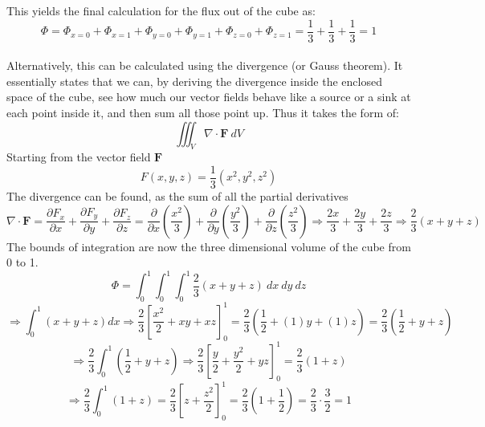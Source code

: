 This yields the final calculation for the flux out of the cube as:
\[\Phi =\Phi_{x=0} + \Phi_{x=1} + \Phi_{y=0} + \Phi_{y=1} + \Phi_{z=0} + \Phi_{z=1} = \frac{1}{3} + \frac{1}{3} + \frac{1}{3} = 1 \]
\\
Alternatively, this can be calculated using the divergence (or Gauss theorem). It essentially states that we can, by deriving the divergence
inside the enclosed space of the cube, see how much our vector fields behave like a source or a sink at each point inside it, and then sum all those 
point up. Thus it takes the form of: \[\iiint_V \nabla \cdot \mathbf{F} \ dV\]
Starting from the vector field $\mathbf{F}$
\[F(x,y,z) = \frac{1}{3}(x^2,y^2,z^2)\]
The divergence can be found, as the sum of all the partial derivatives
\[\nabla \cdot \mathbf{F} = 
\frac{\partial F_x}{\partial x} +
\frac{\partial F_y}{\partial y} +
\frac{\partial F_z}{\partial z} = 
\frac{\partial}{\partial x}\left(\frac{x^2}{3}\right) + 
\frac{\partial}{\partial y}\left(\frac{y^2}{3}\right) + 
\frac{\partial}{\partial z}\left(\frac{z^2}{3}\right)  
\Rightarrow
\frac{2x}{3} + \frac{2y}{3} + \frac{2z}{3} 
\Rightarrow
\frac{2}{3}(x+y+z)
\]
The bounds of integration are now the three dimensional volume of the cube from 0 to 1.
\[\Phi = \int_{0}^{1}\int_{0}^{1}\int_{0}^{1} \frac{2}{3}(x+y+z) \ dx \ dy \ dz \]
\[\Rightarrow \int_{0}^{1} (x+y+z) dx \Rightarrow \frac{2}{3}\left[\frac{x^2}{2} + xy + xz\right]_0^1 =\frac{2}{3}\left(\frac{1}{2}  + (1)y + (1)z\right) =\frac{2}{3}\left(\frac{1}{2} + y + z\right)\]
\[\Rightarrow \frac{2}{3}\int_{0}^{1} \left(\frac{1}{2} + y + z\right) \Rightarrow \frac{2}{3}\left[\frac{y}{2} + \frac{y^2}{2} + yz\right]_0^1 =\frac{2}{3}\left(1+z\right) \]
\[\Rightarrow \frac{2}{3}\int_{0}^{1} \left(1+z\right) = \frac{2}{3}\left[z+\frac{z^2}{2}\right]_0^1 = \frac{2}{3}\left(1+\frac{1}{2}\right) = \frac{2}{3} \cdot \frac{3}{2} = 1\]
